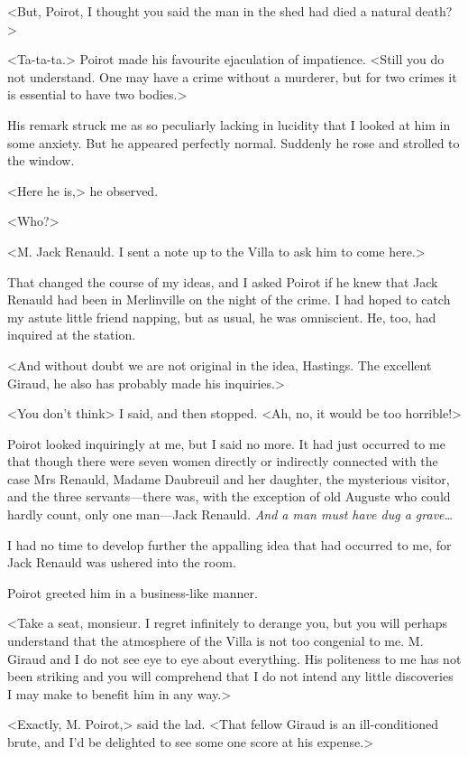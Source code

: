  <But, Poirot, I thought you said the man in the shed had died a natural death?> 

 <Ta-ta-ta.> Poirot made his favourite ejaculation of impatience. <Still you do not understand. One may have a crime without a murderer, but for two crimes it is essential to have two bodies.> 

 His remark struck me as so peculiarly lacking in lucidity that I looked at him in some anxiety. But he appeared perfectly normal. Suddenly he rose and strolled to the window. 

 <Here he is,> he observed. 

 <Who?> 

 <M. Jack Renauld. I sent a note up to the Villa to ask him to come here.> 

 That changed the course of my ideas, and I asked Poirot if he knew that Jack Renauld had been in Merlinville on the night of the crime. I had hoped to catch my astute little friend napping, but as usual, he was omniscient. He, too, had inquired at the station. 

 <And without doubt we are not original in the idea, Hastings. The excellent Giraud, he also has probably made his inquiries.> 

 <You don't think\longdash> I said, and then stopped. <Ah, no, it would be too horrible!> 

 Poirot looked inquiringly at me, but I said no more. It had just occurred to me that though there were seven women directly or indirectly connected with the case Mrs Renauld, Madame Daubreuil and her daughter, the mysterious visitor, and the three servants—there was, with the exception of old Auguste who could hardly count, only one man—Jack Renauld. \emph{And a man must have dug a grave\dots} 

 I had no time to develop further the appalling idea that had occurred to me, for Jack Renauld was ushered into the room. 

 Poirot greeted him in a business-like manner. 

 <Take a seat, monsieur. I regret infinitely to derange you, but you will perhaps understand that the atmosphere of the Villa is not too congenial to me. M. Giraud and I do not see eye to eye about everything. His politeness to me has not been striking and you will comprehend that I do not intend any little discoveries I may make to benefit him in any way.> 

 <Exactly, M. Poirot,> said the lad. <That fellow Giraud is an ill-conditioned brute, and I'd be delighted to see some one score at his expense.> 

